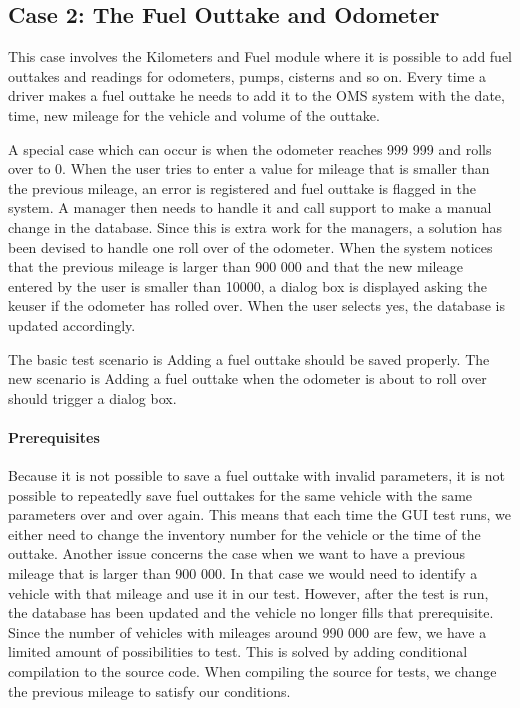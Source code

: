 \documentclass{article}
\begin{document}
			\subsection{Case 2: The Fuel Outtake and Odometer}

			This case involves the Kilometers and Fuel module where it is possible to add fuel outtakes and readings for odometers, pumps, cisterns and so on. Every time a driver makes a fuel outtake he needs to add it to the OMS system with the date, time, new mileage for the vehicle and volume of the outtake.

			A special case which can occur is when the odometer reaches 999 999 and rolls over to 0. When the user tries to enter a value for mileage that is smaller than the previous mileage, an error is registered and fuel outtake is flagged in the system. A manager then needs to handle it and call support to make a manual change in the database.
			Since this is extra work for the managers, a solution has been devised to handle one roll over of the odometer. When the system notices that the previous mileage is larger than 900 000 and that the new mileage entered by the user is smaller than 10000, a dialog box is displayed asking the keuser if the odometer has rolled over. When the user selects yes, the database is updated accordingly.

			The basic test scenario is Adding a fuel outtake should be saved properly.
			The new scenario is Adding a fuel outtake when the odometer is about to roll over should trigger a dialog box.

			\paragraph{Prerequisites}
			Because it is not possible to save a fuel outtake with invalid parameters, it is not possible to repeatedly save fuel outtakes for the same vehicle with the same parameters over and over again.
			This means that each time the GUI test runs, we either need to change the inventory number for the vehicle or the time of the outtake.
			Another issue concerns the case when we want to have a previous mileage that is larger than 900 000. In that case we would need to identify a vehicle with that mileage and use it in our test.
			However, after the test is run, the database has been updated and the vehicle no longer fills that prerequisite. Since the number of vehicles with mileages around 990 000 are few, we have a limited amount of possibilities to test.
			This is solved by adding conditional compilation to the source code. When compiling the source for tests, we change the previous mileage to satisfy our conditions.
\end{document}
